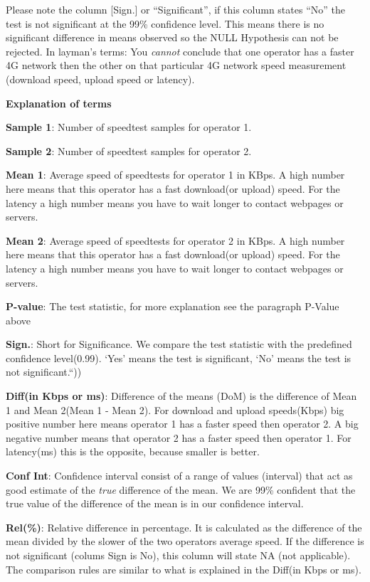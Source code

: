 \documentclass[]{article}
\begin{document}
Please note the column {[}Sign.{]} or ``Significant'', if this column
states ``No'' the test is not significant at the 99\% confidence level.
This means there is no significant difference in means observed so the
NULL Hypothesis can not be rejected. In layman's terms: You
\emph{cannot} conclude that one operator has a faster 4G network then
the other on that particular 4G network speed measurement (download
speed, upload speed or latency).

\textbf{Explanation of terms}

\footnotesize

\textbf{Sample 1}: Number of speedtest samples for operator 1.

\textbf{Sample 2}: Number of speedtest samples for operator 2.

\textbf{Mean 1}: Average speed of speedtests for operator 1 in KBps. A
high number here means that this operator has a fast download(or upload)
speed. For the latency a high number means you have to wait longer to
contact webpages or servers.

\textbf{Mean 2}: Average speed of speedtests for operator 2 in KBps. A
high number here means that this operator has a fast download(or upload)
speed. For the latency a high number means you have to wait longer to
contact webpages or servers.

\textbf{P-value}: The test statistic, for more explanation see the
paragraph P-Value above

\textbf{Sign.}: Short for Significance. We compare the test statistic
with the predefined confidence level(0.99). `Yes' means the test is
significant, `No' means the test is not significant.``))

\textbf{Diff(in Kbps or ms)}: Difference of the means (DoM) is the
difference of Mean 1 and Mean 2(Mean 1 - Mean 2). For download and
upload speeds(Kbps) big positive number here means operator 1 has a
faster speed then operator 2. A big negative number means that operator
2 has a faster speed then operator 1. For latency(ms) this is the
opposite, because smaller is better.

\textbf{Conf Int}: Confidence interval consist of a range of values
(interval) that act as good estimate of the \emph{true} difference of
the mean. We are 99\% confident that the true value of the difference of
the mean is in our confidence interval.

\textbf{Rel(\%)}: Relative difference in percentage. It is calculated as
the difference of the mean divided by the slower of the two operators
average speed. If the difference is not significant (colums Sign is No),
this column will state NA (not applicable). The comparison rules are
similar to what is explained in the Diff(in Kbps or ms).

\normalsize
\end{document}
